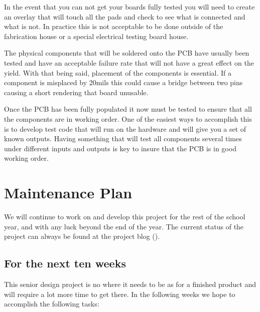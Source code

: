 \documentclass{article}
\numberwithin{equation}{section} %
\begin{document}
In the event that you can not get your boards fully tested you will need to create an overlay that will touch all the pads and check to see what is connected and what is not. In practice this is not acceptable to be done outside of the fabrication house or a special electrical testing board house.

The physical components that will be soldered onto the PCB have usually been tested and have an acceptable failure rate that will not have a great effect on the yield. With that being said, placement of the components is essential. If a component is misplaced by 20mils this could cause a bridge between two pins causing a short rendering that board unusable.

Once the PCB has been fully populated it now must be tested to ensure that all the components are in working order. One of the easiest ways to accomplish this is to develop test code that will run on the hardware and will give you a set of known outputs. Having something that will test all components several times under different inputs and outputs is key to insure that the PCB is in good working order.

\section{Maintenance Plan}
We will continue to work on and develop this project for the rest of the school year, and with any luck beyond the end of the year. The current status of the project can always be found at the project blog (\cite{anzhelka_blog}).

\subsection{For the next ten weeks} \label{maintenance_plan_10}
This senior design project is no where it needs to be as for a finished product and will require a lot more time to get there. In the following weeks we hope to accomplish the following tasks:
\end{document}
